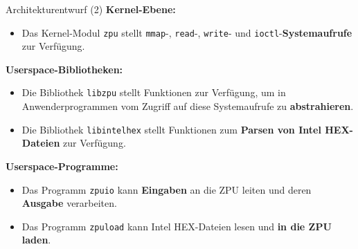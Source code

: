 \documentclass[10pt]{beamer}
\begin{document}
	\begin{frame}{Architekturentwurf (2)}
		\textbf{Kernel-Ebene:}
		\begin{itemize}
			\item Das Kernel-Modul \texttt{zpu} stellt \texttt{mmap}-, \texttt{read}-, \texttt{write}- und \texttt{ioctl}-\textbf{Systemaufrufe} zur Verfügung.
		\end{itemize}
		\textbf{Userspace-Bibliotheken:}
		\begin{itemize}
			\item Die Bibliothek \texttt{libzpu} stellt Funktionen zur Verfügung, um in Anwenderprogrammen vom Zugriff auf diese Systemaufrufe zu \textbf{abstrahieren}.
			\item Die Bibliothek \texttt{libintelhex} stellt Funktionen zum \textbf{Parsen von Intel HEX-Dateien} zur Verfügung.
		\end{itemize}
		\textbf{Userspace-Programme:}
		\begin{itemize}
			\item Das Programm \texttt{zpuio} kann \textbf{Eingaben} an die ZPU leiten und deren \textbf{Ausgabe} verarbeiten.
			\item Das Programm \texttt{zpuload} kann Intel HEX-Dateien lesen und \textbf{in die ZPU laden}.
		\end{itemize}
	\end{frame}
	
\end{document}
